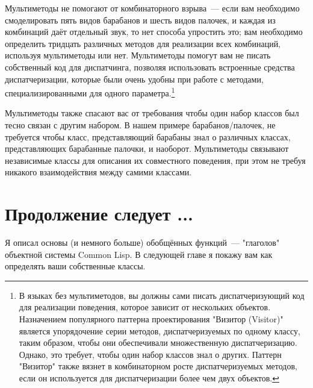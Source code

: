 Мультиметоды не помогают от комбинаторного взрыва~--- если вам необходимо смоделировать
пять видов барабанов и шесть видов палочек, и каждая из комбинаций даёт отдельный звук, то
нет способа упростить это; вам необходимо определить тридцать различных методов для
реализации всех комбинаций, используя мультиметоды или нет.  Мультиметоды помогут вам не
писать собственный код для диспатчинга, позволяя использовать встроенные средства
диспатчеризации, которые были очень удобны при работе с методами, специализированными для
одного параметра.\footnote{В языках без мультиметодов, вы должны сами писать
  диспатчеризующий код для реализации поведения, которое зависит от нескольких объектов.
  Назначением популярного паттерна проектирования "Визитор (Visitor)" является
  упорядочение серии методов, диспатчеризуемых по одному классу, таким образом, чтобы они
  обеспечивали множественную диспатчеризацию.  Однако, это требует, чтобы один набор
  классов знал о других.  Паттерн "Визитор" также вязнет в комбинаторном росте
  диспатчеризуемых методов, если он используется для диспатчеризации более чем двух
  объектов.}

Мультиметоды также спасают вас от требования чтобы один набор классов был тесно связан с
другим набором. В нашем примере барабанов/палочек, не требуется чтобы класс,
представляющий барабаны знал о различных классах, представляющих барабанные палочки, и
наоборот.  Мультиметоды связывают независимые классы для описания их совместного
поведения, при этом не требуя никакого взаимодействия между самими классами.

\section{Продолжение следует ...}

Я описал основы (и немного больше) обобщённых функций~--- "глаголов" объектной системы
Common Lisp.  В следующей главе я покажу вам как определять ваши собственные классы.

